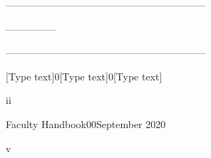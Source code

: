 \documentclass[letterpaper, 11pt]{article}
\begin{document}
------------------------------------------------------------

---------------

------------------------------------------------------------

[Type text]0[Type text]0[Type text]





    

ii
    

Faculty Handbook00September 2020

v
    



 
 
\end{document}
